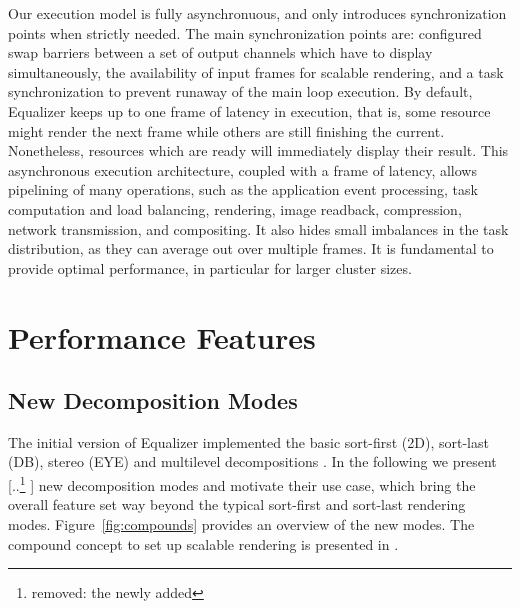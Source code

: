 \documentclass[10pt,journal,compsoc]{IEEEtran}
\newcommand{\fig}[1]{Figure~\ref{#1}}
\providecommand{\DIFaddtex}[1]{{\protect\color{blue} \sf #1}} %
\providecommand{\DIFdeltex}[1]{{\protect\color{red} [..\footnote{removed: #1} ]}} %
\providecommand{\DIFaddbegin}{} %
\providecommand{\DIFaddend}{} %
\providecommand{\DIFdelbegin}{} %
\providecommand{\DIFdelend}{} %
\providecommand{\DIFadd}[1]{\texorpdfstring{\DIFaddtex{#1}}{#1}} %
\providecommand{\DIFdel}[1]{\texorpdfstring{\DIFdeltex{#1}}{}} %
\newcommand{\DIFscaledelfig}{0.5}
\newlength{\DIFdelgraphicswidth} %
\newlength{\DIFdelgraphicsheight} %
\newcommand{\DIFaddincludegraphics}[2][]{{\color{blue}\fbox{\DIFOincludegraphics[#1]{#2}}}} %
\newcommand{\DIFdelincludegraphics}[2][]{%
\sbox{\DIFdelgraphicsbox}{\DIFOincludegraphics[#1]{#2}}%
\settoboxwidth{\DIFdelgraphicswidth}{\DIFdelgraphicsbox} %
\settoboxtotalheight{\DIFdelgraphicsheight}{\DIFdelgraphicsbox} %
\scalebox{\DIFscaledelfig}{%
\parbox[b]{\DIFdelgraphicswidth}{\usebox{\DIFdelgraphicsbox}\\[-\baselineskip] \rule{\DIFdelgraphicswidth}{0em}}\llap{\resizebox{\DIFdelgraphicswidth}{\DIFdelgraphicsheight}{%
\setlength{\unitlength}{\DIFdelgraphicswidth}%
\begin{picture}(1,1)%
\thicklines\linethickness{2pt} %
{\color[rgb]{1,0,0}\put(0,0){\framebox(1,1){}}}%
{\color[rgb]{1,0,0}\put(0,0){\line( 1,1){1}}}%
{\color[rgb]{1,0,0}\put(0,1){\line(1,-1){1}}}%
\end{picture}%
}\hspace*{3pt}}} %
} %
\DeclareRobustCommand{\DIFaddbegin}{\DIFOaddbegin \let\includegraphics\DIFaddincludegraphics} %
\DeclareRobustCommand{\DIFaddend}{\DIFOaddend \let\includegraphics\DIFOincludegraphics} %
\DeclareRobustCommand{\DIFdelbegin}{\DIFOdelbegin \let\includegraphics\DIFdelincludegraphics} %
\DeclareRobustCommand{\DIFdelend}{\DIFOaddend \let\includegraphics\DIFOincludegraphics} %
\begin{document}
\DIFadd{Our execution model is fully asynchronuous, and only introduces synchronization
points when strictly needed. The main synchronization points are: configured
swap barriers between a set of output channels which have to display
simultaneously, the availability of input frames for scalable rendering, and a
task synchronization to prevent runaway of the main loop execution. By default,
Equalizer keeps up to one frame of latency in execution, that is, some resource
might render the next frame while others are still finishing the current.
Nonetheless, resources which are ready will immediately display their result.
This asynchronous execution architecture, coupled with a frame of latency,
allows pipelining of many operations, such as the application event processing,
task computation and load balancing, rendering, image readback, compression,
network transmission, and compositing. It also hides small imbalances in the
task distribution, as they can average out over multiple frames. It is
fundamental to provide optimal performance, in particular for larger cluster
sizes.
}

\DIFaddend %
\section{Performance Features}

\DIFdelbegin %

\DIFdelend %
\subsection{New Decomposition Modes}

The initial version of \textsf{Equalizer} implemented the basic sort-first
(2D), sort-last (DB), stereo (EYE) and multilevel decompositions \cite{EMP:09}.
In the following we present \DIFdelbegin \DIFdel{the newly added }\DIFdelend \DIFaddbegin \DIFadd{new }\DIFaddend decomposition modes and motivate their use
case, which bring the overall feature set way beyond the typical sort-first and
sort-last rendering modes. \fig{fig:compounds} provides an overview of the new
modes. The compound concept to set up scalable rendering is presented in
\cite{EMP:09}.
\end{document}
